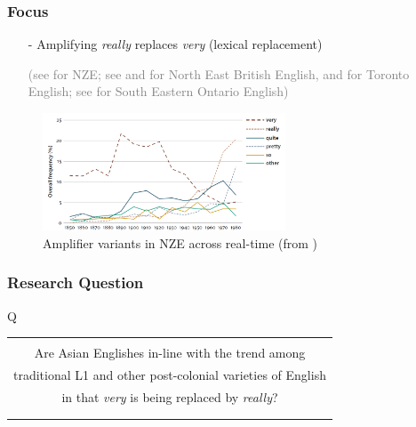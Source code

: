 \documentclass[12pt, table]{beamer}
\begin{document}
\begin{frame}
\frametitle{Focus}
\begin{itemize}
\item[-] Amplifying \textit{really} replaces \textit{very} (lexical replacement)\\
\textcolor{gray}{\begin{scriptsize} (see \citet{darcy2015stability} for NZE; see \citet[][]{ito2003well} and \citet[][]{barnfield2010intensifiers} for North East British English, \citet{tagliamonte2008intensifiers} and \citet[][]{tagliamonte2014expanding} for Toronto English; see \citet[][]{tagliamonte2014expanding} for South Eastern Ontario English)\end{scriptsize}} 
\end{itemize}
\begin{center}
\begin{figure}
\includegraphics[height=3.5cm]{images/DarcyRealTime.png}
\caption{Amplifier variants in NZE across real-time (from \citet[468]{darcy2015stability})}
\end{figure}
\end{center}
\end{frame}

\begin{frame}
\frametitle{Research Question}
\begin{center}
Q\\[.5cm]
\begin{tabular}{!{\color{uq}\vrule} c !{\color{uq}\vrule}}
\hline\\
Are Asian Englishes in-line with the trend among \\
traditional L1 and other post-colonial varieties of English \\
in that \textit{very} is being replaced by \textit{really}? \\
\\\hline
\end{tabular}
\end{center}
\end{frame}
\end{document}
